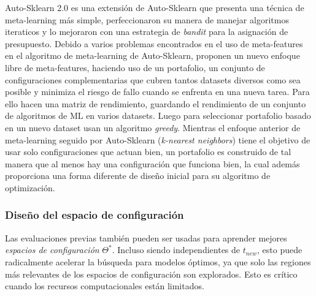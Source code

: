 Auto-Sklearn 2.0 es una extensión de Auto-Sklearn que presenta una técnica de meta-learning más simple, perfeccionaron su manera de manejar algoritmos iteraticos y lo mejoraron con una estrategia de \textit{bandit} para la asignación de presupuesto. Debido a varios problemas encontrados en el uso de meta-features en el algoritmo de meta-learning de Auto-Sklearn, proponen un nuevo enfoque libre de meta-features, haciendo uso de un portafolio, un conjunto de configuraciones complementarias que cubren tantos datasets diversos como sea posible y minimiza el riesgo de fallo cuando se enfrenta en una nueva tarea. Para ello hacen una matriz de rendimiento, guardando el rendimiento de un conjunto de algoritmos de ML en varios datasets. Luego para seleccionar portafolio basado en un nuevo dataset usan un algoritmo \textit{greedy}. Mientras el enfoque anterior de meta-learning seguido por Auto-Sklearn (\textit{k-nearest neighbors}) tiene el objetivo de usar solo configuraciones que actuan bien, un portafolio es construido de tal manera que al menos hay una configuración que funciona bien, la cual además proporciona una forma diferente de diseño inicial para su algoritmo de optimización.

\subsubsection{Diseño del espacio de configuración}



Las evaluaciones previas también pueden ser usadas para aprender mejores \textit{espacios de configuración} $\Theta^*$. Incluso siendo independientes de $t_{new}$, esto puede radicalmente acelerar la búsqueda para modelos óptimos, ya que solo las regiones más relevantes de los espacios de configuración son explorados. Esto es crítico cuando los recursos computacionales están limitados. 

